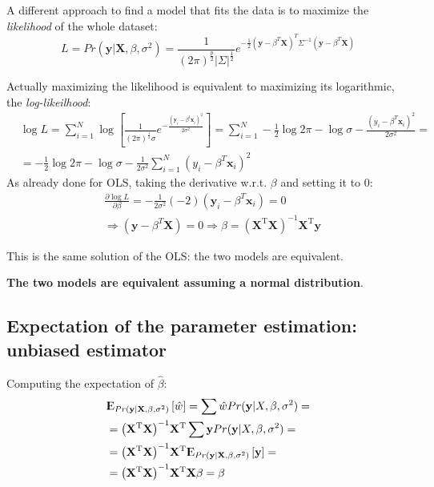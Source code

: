 \documentclass[12pt, letterpaper]{article}
\theoremstyle{definition}
\newcommand{\E}{{\rm I\kern-.3em E}}
\newcommand{\X}{\mathrm{\mathbf{X}}}
\newcommand{\y}{\mathbf{y}}
\newcommand{\x}{\mathbf{x}}
\newcommand{\inv}{\mathrm{\left( \X^T\X\right)^{-1}}}
\newcommand{\HM}{\mathrm{\inv\X^T}}
\begin{document}
A different approach to find a model that fits the data is to maximize the \textit{likelihood} of the whole dataset:
\begin{equation}
L = Pr(\y|\X, \beta, \sigma^2)  = \frac{1}{(2\pi)^{\frac{p}{2}}|\Sigma|^\frac{1}{2}}e^{-\frac{1}{2}\left(\y-\beta^T\X\right)^T\Sigma^{-1}\left(\y-\beta^T\X\right)}
\end{equation}

Actually maximizing the likelihood is equivalent to maximizing its logarithmic, the \textit{log-likeilhood}:
\begin{equation}
\begin{aligned}
&\log L = \sum_{i=1}^N \log\left[\frac{1}{(2\pi)^{\frac{1}{2}}\sigma}e^{-\frac{\left(\y_i-\beta^t \x_i\right)^2} {2\sigma^2}}\right] =\sum_{i=1}^N -\frac{1}{2}\log2\pi -\log \sigma -\frac{\left(y_i-\beta^T\x_i\right)^2} {2\sigma^2} =\\
&= -\frac{1}{2}\log2\pi -\log \sigma -\frac{1}{2\sigma^2} \sum_{i=1}^N\left(y_i-\beta^T\x_i\right)^2
\end{aligned}
\end{equation}
As already done for OLS, taking the derivative w.r.t. $\beta$ and setting it to $0$:
\begin{equation}
\begin{aligned}
&\frac{\partial \log L}{\partial \beta} = -\frac{1}{2\sigma^2} \left(-2\right) \left(\y_i-\beta^T\x_i\right) = 0 \\
&\Rightarrow \left(\y-\beta^T\X \right)= 0 \Rightarrow \beta = \HM \y
\end{aligned}
\end{equation}

This is the same solution of the OLS: the two models are equivalent.

\textbf{The two models are equivalent assuming a normal distribution}.

\subsection{Expectation of the parameter estimation: unbiased estimator}
Computing the expectation of $\hat{\beta}$:
\begin{equation}
\begin{aligned}
&\E_{Pr(\y|\X,\beta, \sigma^2)}\left[ \hat{w}\right]= \sum \hat{w} Pr(\y|X, \beta, \sigma^2) =\\
&= \HM \sum \y Pr(\y |X, \beta, \sigma^2)  = \\
&=\HM \E_{Pr(\y | \X,\beta, \sigma^2)} \left[ \y\right] = \\
&= \HM \X \beta = \beta
\end{aligned}
\end{equation}
\end{document}
